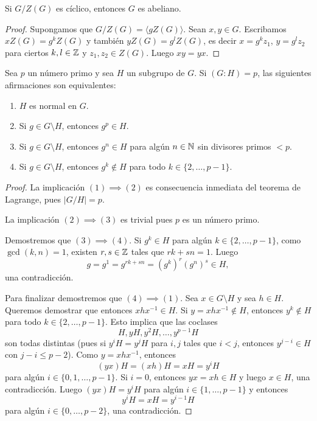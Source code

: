 \begin{proposition}
Si $G/Z(G)$ es cíclico, entonces $G$ es abeliano.
\end{proposition}

\begin{proof}
Supongamos que $G/Z(G)=\langle gZ(G)\rangle$. Sean $x,y\in G$. Escribamos $xZ(G)=g^kZ(G)$ y también $yZ(G)=g^lZ(G)$, es decir
$x=g^kz_1$, $y=g^lz_2$ para ciertos $k,l\in\mathbb{Z}$ y $z_1,z_2\in Z(G)$. Luego $xy=yx$. 
\end{proof}

\begin{theorem}
Sea $p$ un número primo y sea $H$ un subgrupo de $G$. Si $(G:H)=p$, las siguientes afirmaciones son equivalentes:
\begin{enumerate}
\item $H$ es normal en $G$.
\item Si $g\in G\setminus H$, entonces $g^p\in H$.
\item Si $g\in G\setminus H$, entonces $g^n\in H$ para algún $n\in\mathbb{N}$ sin divisores primos $<p$.
\item Si $g\in G\setminus H$, entonces $g^k\not\in H$ para todo $k\in\{2,\dots,p-1\}$. 
\end{enumerate}
\end{theorem}

\begin{proof}
	La implicación $(1)\implies(2)$ es consecuencia inmediata del teorema de Lagrange, pues $|G/H|=p$. 
	
	La implicación $(2)\implies(3)$ es trivial pues $p$ es un número primo. 
	
	Demostremos que $(3)\implies(4)$. Si $g^k\in H$ para algún $k\in\{2,\dots,p-1\}$, como $\gcd(k,n)=1$, existen $r,s\in\mathbb{Z}$ tales que
	$rk+sn=1$. Luego
	\[
	g=g^1=g^{rk+sn}=(g^k)^r(g^n)^s\in H,
	\]
	una contradicción. 
	
	Para finalizar demostremos que $(4)\implies(1)$. Sea $x\in G\setminus H$ y sea $h\in H$. Queremos demostrar que entonces $xhx^{-1}\in H$. Si $y=xhx^{-1}\not\in H$, entonces
	$y^k\not\in H$ para todo $k\in\{2,\dots,p-1\}$. Esto implica que las coclases 
	\[
	H,yH,y^2H,\dots,y^{p-1}H
	\]
	son todas distintas (pues si $y^iH=y^jH$ para $i,j$ tales que $i<j$, entonces $y^{j-i}\in H$ con $j-i\leq p-2$). Como $y=xhx^{-1}$, 
	entonces
	\[
	(yx)H=(xh)H=xH=y^iH
	\]
	para algún $i\in\{0,1,\dots,p-1\}$. Si $i=0$, entonces $yx=xh\in H$ y luego $x\in H$, una contradicción. Luego $(yx)H=y^iH$ para algún $i\in\{1,\dots,p-1\}$ y entonces
	\[
	y^iH=xH=y^{i-1}H
	\]
	para algún $i\in\{0,\dots,p-2\}$, una contradicción.  
\end{proof}

